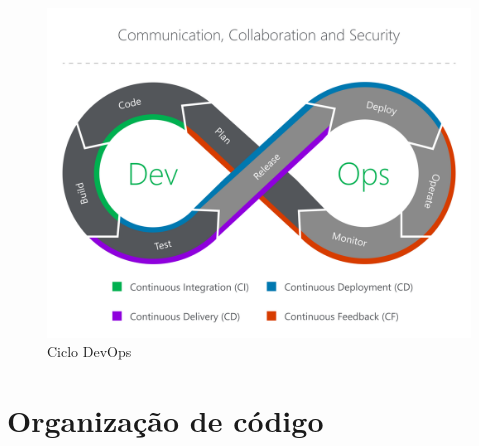 \begin{figure}[htb]
	\caption{\label{figura_devops}Ciclo DevOps}
	\begin{center}
	    \includegraphics[scale=0.20]{Imagens/devops2.pdf}
	\end{center}
\end{figure}


\section{Organização de código}

